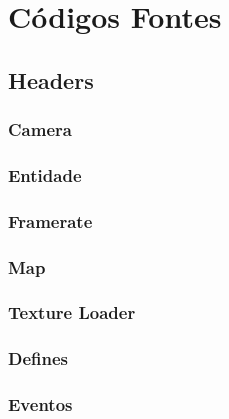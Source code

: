 \newpage
\section{Códigos Fontes}\label{src}

%
\subsection{Headers}\label{.h}

\subsubsection{Camera}

\subsubsection{Entidade}

\subsubsection{Framerate}

\subsubsection{Map}

\subsubsection{Texture Loader}

\subsubsection{Defines}

\subsubsection{Eventos}

